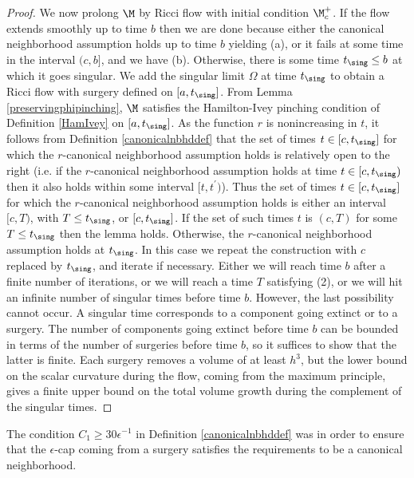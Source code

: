 \begin{proof}
We now prolong $\M$  by Ricci flow with initial
condition $\M_c^+$. If the flow extends smoothly
up to time $b$ then we are done because either the canonical neighborhood
assumption holds up to time $b$ yielding (a), or it fails at some
time in the interval $(c,b]$, and we have (b).
Otherwise, there is some time $t_{\sing} \le b$ at which it goes singular.
We add the singular limit $\Omega$ at time $t_{\sing}$
to obtain a Ricci flow with surgery defined on $[a, t_{\sing}]$.
From Lemma \ref{preservingphipinching},
$\M$ satisfies
the Hamilton-Ivey pinching condition of
Definition \ref{HamIvey} on $[a,t_{\sing}]$.
As the function $r$ is nonincreasing in $t$, it follows from
Definition \ref{canonicalnbhddef} that the set of times
$t\in [c,t_{\sing}]$ for which the $r$-canonical neighborhood assumption
holds is relatively open to the right (i.e. if the $r$-canonical
neighborhood assumption holds at time $t \in [c, t_{\sing})$ then
it also holds within some interval
$[t, t^\prime)$). Thus the set of times
$t\in [c,t_{\sing}]$ for which the $r$-canonical neighborhood assumption
holds is either an interval $[c, T)$, with $T \le t_{\sing}$, or
$[c, t_{\sing}]$.
If the set of such times $t$ is
$(c, T)$ for some $T \le t_{\sing}$ then the lemma holds.
Otherwise, the $r$-canonical neighborhood assumption
holds at $t_{\sing}$.  In this case we repeat the construction
with $c$ replaced by $t_{\sing}$, and iterate if necessary. Either we
will reach time $b$ after a finite number  of iterations, or we
will reach a time $T$ satisfying (2),
or we will hit an infinite number of singular times
before time $b$. However, the last possibility cannot
occur.  A singular time corresponds to a component going extinct or
to a surgery. The number of components going extinct before time $b$
can be bounded in terms of the number of surgeries before time $b$,
so it suffices to show that the latter is finite.
Each surgery removes a volume of at least $h^3$, but
the lower bound on the scalar curvature during the flow,
coming from the maximum principle,
gives a finite upper bound on the total volume growth during the complement
of the singular times.
\end{proof}

\begin{remark}
  \label{rem:kl-performing-surgery-continuing-flows-structural-remark-canonical-neighborhoods}
 \label{30}
The condition $C_1 \ge 30 \epsilon^{-1}$ in
Definition \ref{canonicalnbhddef}
was in order to ensure that the $\epsilon$-cap coming from a
surgery satisfies the requirements to be a canonical neighborhood.
\end{remark}

